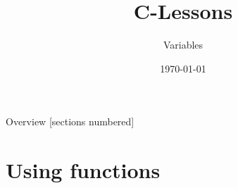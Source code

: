 


\title{C-Lessons}
\subtitle{Variables}
\date{\today}

\usetikzlibrary{tikzmark}


\begin{frame}
	\titlepage
\end{frame}
\begin{frame}{Overview}
	[sections numbered]
	\tableofcontents
\end{frame}

\section{Using functions}
\subsection{}

